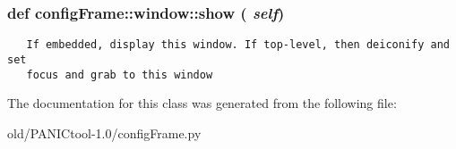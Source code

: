 \subsubsection{\setlength{\rightskip}{0pt plus 5cm}def config\-Frame::window::show ( {\em self})}\label{classconfigFrame_1_1window_7b5e7f961d3544457f6d7d9f2d2c69b7}




\footnotesize\begin{verbatim}
   If embedded, display this window. If top-level, then deiconify and set
   focus and grab to this window
\end{verbatim}
\normalsize
 

The documentation for this class was generated from the following file:\begin{CompactItemize}
\item 
old/PANICtool-1.0/config\-Frame.py\end{CompactItemize}
